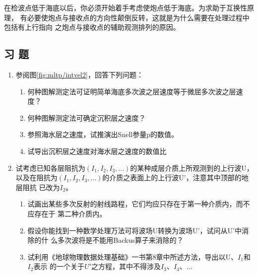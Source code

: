在检波点低于海底以后，你必须开始着手考虑使炮点低于海底。为求助于互换性原理，
有必要使炮点与接收点的方向性颠倒反转，这就是为什么需要在处理过程中包括有上行指向
之炮点与接收点的辅助观测排列的原因。

\subsection{习 题}
\label{sec:5.6.9}

\begin{enumerate}
\item 参阅图\ref{fig:mltp/intvel2}，回答下列问题：
\begin{enumerate}
\item
  何种图解测定法可证明简单海底多次波之层速度等于微屈多次波之层速度？
\item
  何种图解测定法可确定沉积层之速度？
\item
  参照海水层之速度，试推演出Snell参量p的数值。
\item
  试导出沉积层之速度对海水层之速度的数值比
\end{enumerate}
\item   试考虑已知各层阻抗为$(I_1,I_2,I_3,...)$的某种成层介质上所观测到的上行波U，
  以及在阻抗为$(I_1,I_2,I_3,...)$的介质之表面上的上行波U'，注意其中顶部的地层阻抗
  已改为$I_2$。
  \begin{enumerate}
  \item
  试画出某些多次反射的射线路程，它们均应只存在于第一种介质内，而不应存在于
  第二种介质内。
\item
  假设你能找到一种数学处理万法可将波场U转换为波场U'，试问从U'中消除的什
  么多次波将是不能用Backus算子来消除的？
\item
  试利用《地球物理数据处理基础》一书第8章中所述方法，导出以U、$I_1$和$I_2$表示
  的一个关于$U'$之方程，其中不得涉及$I_3$、$I_4$、...
  \end{enumerate}
\end{enumerate}